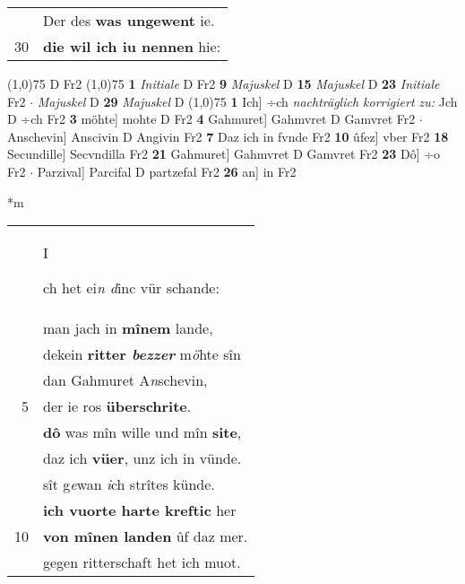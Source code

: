 \documentclass[8pt,a4paper,notitlepage]{article}
\begin{document}
\begin{table}[ht]
\begin{minipage}[t]{0.5\linewidth}
\begin{tabular}{rl}
 & Der des \textbf{was ungewent} ie.\\ 
30 & \textbf{die wil ich iu nennen} hie:\\ 
\end{tabular}
\scriptsize
\line(1,0){75} \newline
D Fr2 \newline
\line(1,0){75} \newline
\textbf{1} \textit{Initiale} D Fr2  \textbf{9} \textit{Majuskel} D  \textbf{15} \textit{Majuskel} D  \textbf{23} \textit{Initiale} Fr2   $\cdot$ \textit{Majuskel} D  \textbf{29} \textit{Majuskel} D  \newline
\line(1,0){75} \newline
\textbf{1} Ich] ÷ch \textit{nachträglich korrigiert zu:} Jch D ÷ch Fr2 \textbf{3} möhte] mohte D Fr2 \textbf{4} Gahmuret] Gahmvret D Gamvret Fr2  $\cdot$ Anschevin] Anscivin D Angivin Fr2 \textbf{7} Daz ich in fvnde Fr2 \textbf{10} ûfez] vber Fr2 \textbf{18} Secundille] Secvndilla Fr2 \textbf{21} Gahmuret] Gahmvret D Gamvret Fr2 \textbf{23} Dô] ÷o Fr2  $\cdot$ Parzival] Parcifal D partzefal Fr2 \textbf{26} an] in Fr2 \newline
\end{minipage}
\hspace{0.5cm}
\begin{minipage}[t]{0.5\linewidth}
\small
\begin{center}*m
\end{center}
\begin{tabular}{rl}
 & \begin{large}I\end{large}ch het ei\textit{n d}inc vür schande:\\ 
 & man jach in \textbf{mînem} lande,\\ 
 & dekein \textbf{ritter \textit{bezzer}} m\textit{ö}hte sîn\\ 
 & dan Gahmuret A\textit{n}schevin,\\ 
5 & der ie ros \textbf{überschrite}.\\ 
 & \textbf{dô} was mîn wille und mîn \textbf{site},\\ 
 & daz ich \textbf{vüer}, unz ich in vünde.\\ 
 & sît g\textit{e}wan \textit{i}ch strîtes künde.\\ 
 & \textbf{ich vuorte harte kreftic} her\\ 
10 & \textbf{von mînen landen} ûf daz mer.\\ 
 & gegen ritterschaft het ich muot.\\ 

\end{tabular}
\end{minipage}
\end{table}
\end{document}
